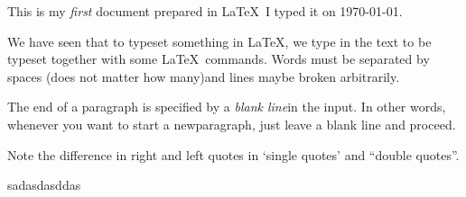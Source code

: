 \documentclass[10pt,a4paper]{article}
\begin{document}
This is my \emph{first} document prepared in \LaTeX\ I typed it on \today.

We have seen that to typeset something in \LaTeX, we type in the text to be typeset together with some \LaTeX\ commands. Words must be separated by spaces (does not matter how many)and lines maybe broken arbitrarily.

The end of a paragraph is specified by a \emph{blank line}in the input. In other words, whenever you want to start a newparagraph, just leave a blank line and proceed. \autocite{test}

Note the difference in right and left quotes  in `single quotes' and ``double quotes''.


sadasdasddas \autocite{example}

\printbibliography
\end{document}
